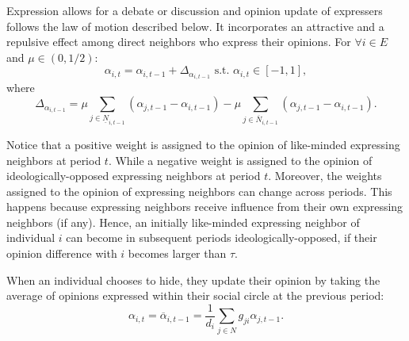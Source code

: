 \documentclass{article}
\begin{document}
Expression allows for a debate or discussion and opinion update of expressers follows the law of motion described below. It incorporates an attractive and a repulsive effect among direct neighbors who express their opinions. For $\forall i \in E$ and $\mu \in (0,1/2)$: 
 \begin{equation}
 \alpha_{i,{t}} =  \alpha_{i,{t-1}} +  \Delta_{\alpha_{i,{t-1}}}  \text{ s.t. } \alpha_{i,t} \in [-1,1],
 \label{lawofmotion}
 \end{equation}
where 
\begin{equation*} \Delta_{\alpha_{i,{t-1}}} = \mu \sum_{j \in \underline{N}_{i,t-1}}   (  \alpha_{j,t-1} - \alpha_{i,t-1} )    - \mu \sum_{j \in \overline{N}_{i,t-1}} ( \alpha_{j,t-1} - \alpha_{i,t-1} ).  \end{equation*} 

Notice that a positive weight is assigned to the opinion of like-minded expressing neighbors at period $t$. While a negative weight is assigned to the opinion of ideologically-opposed expressing neighbors at period $t$.   Moreover, the weights assigned to the opinion of expressing neighbors can change across periods. This happens because expressing neighbors receive influence from their own expressing neighbors (if any). Hence, an initially like-minded expressing neighbor of individual $i$ can become in subsequent periods ideologically-opposed, if their opinion difference with $i$ becomes larger than $\tau$.
\smallskip

When an individual chooses to hide, they update their opinion by taking the average of opinions expressed within their social circle at the previous period: 
\begin{equation} 
\alpha_{i,t} = \overline{\alpha}_{i,t-1} = \frac{1}{d_i}  \sum_{j  \in N} g_{ji} {\alpha}_{j,t-1}. \label{average}
\end{equation}
 
\end{document}
